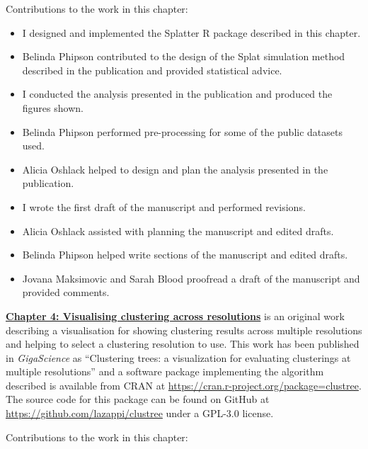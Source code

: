 \documentclass[11pt,a4paper,titlepage,twoside,openright]{style/unimelbthesis}
\theoremstyle{definition}
\theoremstyle{definition}
\theoremstyle{definition}
\theoremstyle{remark}
\begin{document}
\begin{frontmatter}
\begin{preface}
    Contributions to the work in this chapter:
    
    \begin{itemize}
    \item
      I designed and implemented the Splatter R package described in this chapter.
    \item
      Belinda Phipson contributed to the design of the Splat simulation method described in the publication and provided statistical advice.
    \item
      I conducted the analysis presented in the publication and produced the figures shown.
    \item
      Belinda Phipson performed pre-processing for some of the public datasets used.
    \item
      Alicia Oshlack helped to design and plan the analysis presented in the publication.
    \item
      I wrote the first draft of the manuscript and performed revisions.
    \item
      Alicia Oshlack assisted with planning the manuscript and edited drafts.
    \item
      Belinda Phipson helped write sections of the manuscript and edited drafts.
    \item
      Jovana Maksimovic and Sarah Blood proofread a draft of the manuscript and provided comments.
    \end{itemize}
    
    \textbf{\protect\hyperlink{clust-trees}{Chapter 4: Visualising clustering across resolutions}} is an original work describing a visualisation for showing clustering results across multiple resolutions and helping to select a clustering resolution to use. This work has been published in \emph{GigaScience} as ``Clustering trees: a visualization for evaluating clusterings at multiple resolutions'' and a software package implementing the algorithm described is available from CRAN at \url{https://cran.r-project.org/package=clustree}. The source code for this package can be found on GitHub at \url{https://github.com/lazappi/clustree} under a GPL-3.0 license.
    
    Contributions to the work in this chapter:
    

\end{preface}
\end{frontmatter}
\end{document}
